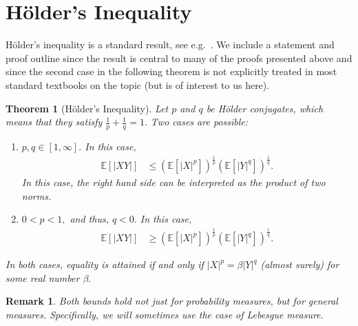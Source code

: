 \documentclass{article}
\newtheorem{theorem}{Theorem}
\numberwithin{theorem}{section}
\numberwithin{example}{section}
\newtheorem{remark}{Remark}
\numberwithin{remark}{section}
\numberwithin{definition}{section}
\begin{document}

\appendix
\section{H\"older's Inequality} \label{app:Holder}

H\"older's inequality is a standard result, see e.g.~\cite[p.80]{Billingsley:95}. We include a statement and proof outline since the result is central to many of the proofs presented above and since the second case in the following theorem is not explicitly treated in most standard textbooks on the topic (but is of interest to us here).


\begin{theorem}[H\"older's Inequality]\label{thm-Holder}
Let $p$ and $q$ be H\"older conjugates, which means that they satisfy $\frac{1}{p} + \frac{1}{q} = 1.$
Two cases are possible:
\begin{enumerate}
\item $p,q \in [1,\infty].$ In this case,
\begin{align}
{\mathbb E}[|XY|] & \le  \left( {\mathbb E}[|X|^{p}] \right)^{\frac{1}{p}} \left( {\mathbb E}[|Y|^{q}] \right)^{\frac{1}{q}}.
\end{align}
In this case, the right hand side can be interpreted as the product of two norms.
\item $0<p<1,$ and thus, $q<0.$ In this case,
\begin{align}
{\mathbb E}[|XY|] & \ge  \left( {\mathbb E}[|X|^{p}] \right)^{\frac{1}{p}} \left( {\mathbb E}[|Y|^{q}] \right)^{\frac{1}{q}}.
\end{align}
\end{enumerate}
In both cases, equality is attained if and only if $|X|^p=\beta|Y|^q$ (almost surely) for some real number $\beta.$
\end{theorem}

\begin{remark}
Both bounds hold not just for probability measures, but for general measures. Specifically, we will sometimes use the case of Lebesgue measure.
\end{remark}
\end{document}
